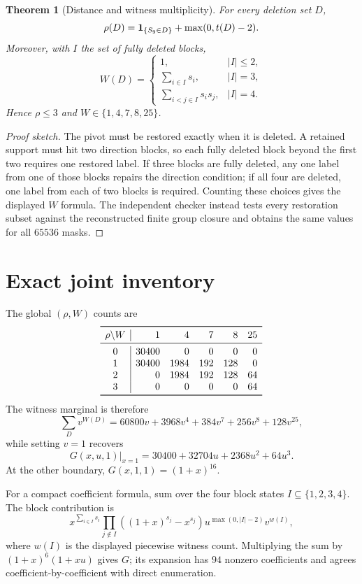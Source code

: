 \documentclass[10pt]{article}
\newtheorem{theorem}{Theorem}
\begin{document}
\begin{theorem}[Distance and witness multiplicity]
For every deletion set $D$,
\[
 \rho(D)={\bf1}_{\{S_9\in D\}}+\max(0,t(D)-2).
\]
Moreover, with $I$ the set of fully deleted blocks,
\[
 W(D)=\begin{cases}
 1,&|I|\le 2,\\
 \displaystyle\sum_{i\in I}s_i,&|I|=3,\\
 \displaystyle\sum_{i<j\in I}s_is_j,&|I|=4.
 \end{cases}
\]
Hence $\rho\le3$ and $W\in\{1,4,7,8,25\}$.
\end{theorem}

\begin{proof}[Proof sketch]
The pivot must be restored exactly when it is deleted.  A retained support
must hit two direction blocks, so each fully deleted block beyond the first
two requires one restored label.  If three blocks are fully deleted, any one
label from one of those blocks repairs the direction condition; if all four
are deleted, one label from each of two blocks is required.  Counting these
choices gives the displayed $W$ formula.  The independent checker instead
tests every restoration subset against the reconstructed finite group
closure and obtains the same values for all $65536$ masks.
\end{proof}

\section{Exact joint inventory}
The global $(\rho,W)$ counts are
\[
\begin{array}{c|rrrrr}
\toprule
\rho\backslash W&1&4&7&8&25\\
\midrule
0&30400&0&0&0&0\\
1&30400&1984&192&128&0\\
2&0&1984&192&128&64\\
3&0&0&0&0&64\\
\bottomrule
\end{array}
\]
The witness marginal is therefore
\[
 \sum_D v^{W(D)}=60800v+3968v^4+384v^7+256v^8+128v^{25},
\]
while setting $v=1$ recovers
\[
 G(x,u,1)\big|_{x=1}=30400+32704u+2368u^2+64u^3.
\]
At the other boundary, $G(x,1,1)=(1+x)^{16}$.

For a compact coefficient formula, sum over the four block states
$I\subseteq\{1,2,3,4\}$.  The block contribution is
\[
 x^{\sum_{i\in I}s_i}\prod_{j\notin I}((1+x)^{s_j}-x^{s_j})
 u^{\max(0,|I|-2)}v^{w(I)},
\]
where $w(I)$ is the displayed piecewise witness count.  Multiplying the
sum by $(1+x)^6(1+xu)$ gives $G$; its expansion has $94$ nonzero
coefficients and agrees coefficient-by-coefficient with direct enumeration.
\end{document}

